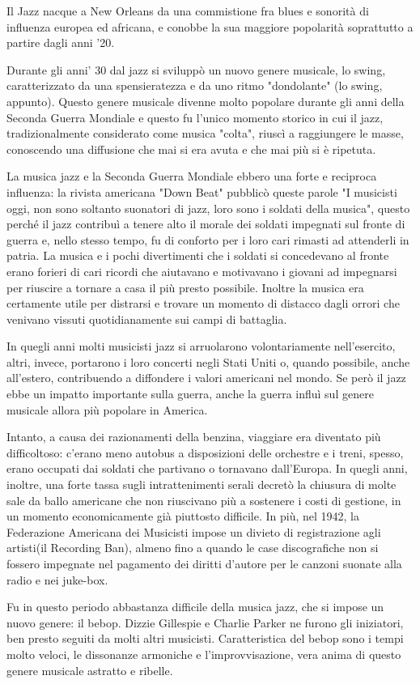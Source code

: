 Il Jazz nacque a New Orleans da una commistione fra blues e sonorità di influenza europea ed africana, e conobbe la sua maggiore popolarità soprattutto a partire dagli anni '20.

Durante gli anni' 30 dal jazz si sviluppò un nuovo genere musicale, lo swing, caratterizzato da una spensieratezza e da uno ritmo "dondolante" (lo swing, appunto). Questo genere musicale divenne molto popolare durante gli anni della Seconda Guerra Mondiale e questo fu l'unico momento storico in cui il jazz, tradizionalmente considerato come musica "colta", riuscì a raggiungere le masse, conoscendo una diffusione che mai si era avuta e che mai più si è ripetuta.

La musica jazz e la Seconda Guerra Mondiale ebbero una forte e reciproca influenza: la rivista americana "Down Beat" pubblicò queste parole "I musicisti oggi, non sono soltanto suonatori di jazz, loro sono i soldati della musica", questo perché il jazz contribuì a tenere alto il morale dei soldati impegnati sul fronte di guerra e, nello stesso tempo, fu di conforto per i loro cari rimasti ad attenderli in patria. La musica e i pochi divertimenti che i soldati si concedevano al fronte erano forieri di cari ricordi che aiutavano e motivavano i giovani ad impegnarsi per riuscire a tornare a casa il più presto possibile. Inoltre la musica era certamente utile per distrarsi e trovare un momento di distacco dagli orrori che venivano vissuti quotidianamente sui campi di battaglia.

In quegli anni molti musicisti jazz si arruolarono volontariamente nell'esercito, altri, invece, portarono i loro concerti negli Stati Uniti o, quando possibile, anche all'estero, contribuendo a diffondere i valori americani nel mondo. Se però il jazz ebbe un impatto importante sulla guerra, anche la guerra influì sul genere musicale allora più popolare in America.

Intanto, a causa dei razionamenti della benzina, viaggiare era diventato più difficoltoso: c'erano meno autobus a disposizioni delle orchestre e i treni, spesso, erano occupati dai soldati che partivano o tornavano dall'Europa. In quegli anni, inoltre, una forte tassa sugli intrattenimenti serali decretò la chiusura di molte sale da ballo americane che non riuscivano più a sostenere i costi di gestione, in un momento economicamente già piuttosto difficile. In più, nel 1942, la Federazione Americana dei Musicisti impose un divieto di registrazione agli artisti(il Recording Ban), almeno fino a quando le case discografiche non si fossero impegnate nel pagamento dei diritti d'autore per le canzoni suonate alla radio e nei juke-box.

Fu in questo periodo abbastanza difficile della musica jazz, che si impose un nuovo genere: il bebop. Dizzie Gillespie e Charlie Parker ne furono gli iniziatori, ben presto seguiti da molti altri musicisti. Caratteristica del bebop sono i tempi molto veloci, le dissonanze armoniche e l'improvvisazione, vera anima di questo genere musicale astratto e ribelle.
